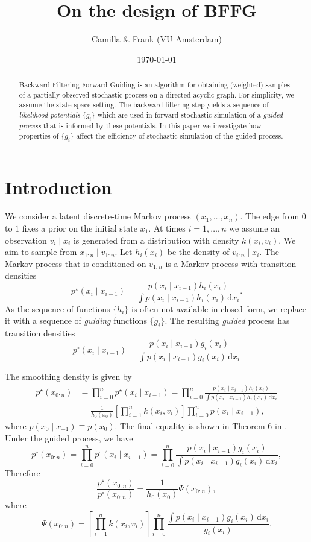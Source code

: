 \documentclass[11pt,reqno]{amsart}
\title{On the design of BFFG}
\author{Camilla \& Frank (VU Amsterdam)}
\date{\today}
\newcommand{\dd}{{\,\mathrm d}}
\theoremstyle{definition}
\begin{document}
 \maketitle\tableofcontents

\begin{abstract}
Backward Filtering Forward Guiding is an algorithm for obtaining (weighted) samples of a partially observed stochastic process on a directed acyclic graph. For simplicity, we assume the state-space setting. The backward filtering step yields a sequence of {\it likelihood potentials} $\{g_i\}$ which are used in forward stochastic simulation of a {\it guided process} that is informed by these potentials. In this paper we investigate how properties of $\{g_i\}$ affect the efficiency of stochastic simulation of the guided process. 
\end{abstract}

\section{Introduction}

We consider a latent discrete-time Markov process $(x_1,\ldots, x_n)$. The edge from $0$ to $1$ fixes a prior on the initial state $x_1$.  At times $i=1,\ldots, n$ we assume an observation $v_i \mid x_i$ is generated from a distribution with density $k(x_i, v_i)$. We aim to sample from $x_{1:n} \mid v_{1:n}$. Let $h_i(x_i)$ be the density of $v_{i:n} \mid x_i$. The Markov process that is conditioned on $v_{1:n}$ is a Markov process with transition densities
\[ p^\star(x_i\mid x_{i-1})=  \frac{p(x_i\mid x_{i-1}) h_i(x_i)}{\int p(x_i\mid x_{i-1}) h_i(x_i)\dd x_i}.\]
 As the sequence of functions $\{h_i\}$ is often not available in closed form, we replace it with a sequence of {\it guiding} functions $\{g_i\}$. The resulting {\it guided} process has transition densities
\[ p^\circ(x_i\mid x_{i-1})=  \frac{p(x_i\mid x_{i-1}) g_i(x_i)}{\int p(x_i\mid x_{i-1}) g_i(x_i)\dd x_i}\]


The smoothing density is given by 
\begin{align*}
	p^\star(x_{0:n}) & = \prod_{i=0}^n p^\star(x_i\mid x_{i-1})= \prod_{i=0}^n \frac{p(x_i\mid x_{i-1}) h_i(x_i)}{\int p(x_i\mid x_{i-1}) h_i(x_i)\dd x_i}\\ &= \frac1{h_0(x_0)}\left[ \prod_{i=1}^n k(x_i, v_i)\right] \prod_{i=0}^n p(x_i \mid x_{i-1}), 
\end{align*} 
where $p(x_0 \mid x_{-1})\equiv p(x_0)$. The final equality is shown in Theorem 6 in \cite{bffg}. 
Under the guided process, we have 
\[ p^\circ(x_{0:n})= \prod_{i=0}^n p^\circ(x_i\mid x_{i-1}) = \prod_{i=0}^n \frac{p(x_i\mid x_{i-1}) g_i(x_i)}{\int p(x_i\mid x_{i-1}) g_i(x_i)\dd x_i}, \]
Therefore
\begin{equation}\label{eq:lr}
	 \frac{p^\star(x_{0:n})}{ p^\circ(x_{0:n})}=\frac1{h_0(x_0)} \Psi(x_{0:n}), 
	\end{equation}
	 where  \[ \Psi(x_{0:n})=\left[\prod_{i=1}^n k(x_i, v_i)\right]
 \prod_{i=0}^n \frac{\int p(x_i\mid x_{i-1}) g_i(x_i)\dd x_i}{g_i(x_i)}. \]
\end{document}
